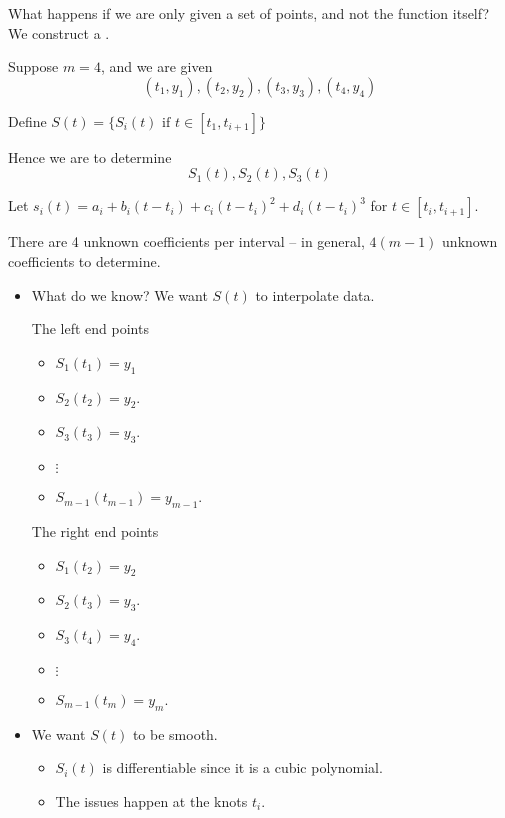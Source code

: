 What happens if we are only given a set of points, and not the function itself? We construct a .

\begin{example}
    Suppose \( m = 4 \), and we are given \[
        (t_1, y_1), (t_2, y_2), (t_3, y_3), (t_4, y_4)
    \]

    Define \( S(t) = \{ S_i(t) \text{ if } t \in [t_1, t_{i+1}] \} \)

    Hence we are to determine \[
        S_1(t), S_2(t), S_3(t)
    \]

    Let \( s_i(t) = a_i + b_i(t - t_i) + c_i(t - t_i)^2 + d_i(t - t_i)^3 \) for \( t \in [t_i, t_{i+1}] \).

    There are 4 unknown coefficients per interval -- in general, \( 4(m - 1) \) unknown coefficients to determine.

    \begin{itemize}
        \item What do we know?
              We want \( S(t) \) to interpolate data.

              The left end points
              \begin{itemize}
                  \item \( S_1(t_1) = y_1 \)
                  \item \( S_2(t_2) = y_2 \).
                  \item \( S_3(t_3) = y_3 \).
                  \item \( \vdots \)
                  \item \( S_{m-1}(t_{m-1}) = y_{m-1} \).
              \end{itemize}
              The right end points
              \begin{itemize}
                  \item \( S_1(t_2) = y_2 \)
                  \item \( S_2(t_3) = y_3 \).
                  \item \( S_3(t_4) = y_4 \).
                  \item \( \vdots \)
                  \item \( S_{m-1}(t_m) = y_m \).
              \end{itemize}

        \item We want \( S(t) \) to be smooth.

              \begin{itemize}
                  \item \( S_i(t) \) is differentiable since it is a cubic polynomial.
                  \item The issues happen at the knots \( t_i \).
              \end{itemize}


\end{itemize}
\end{example}
